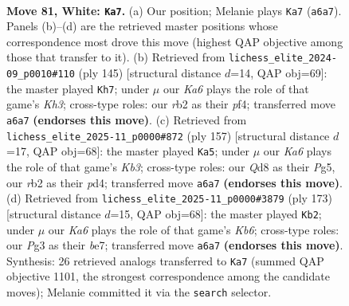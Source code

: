 \documentclass[11pt]{article}
\begin{document}
\clearpage

\begin{figure}[p]\centering
\begin{subfigure}{0.46\textwidth}\centering
\resizebox{\linewidth}{!}{%
\newchessgame
\chessboard[
  setfen={3Q4/8/K1q2pk1/8/8/6P1/1r6/8 w - - 12 81},
  showmover=false,
  pgfstyle=straightmove, color=movearrow, markmove={a6-a7}
]}
\caption{}
\end{subfigure}\hfill
\begin{subfigure}{0.46\textwidth}\centering
\resizebox{\linewidth}{!}{%
\newchessgame
\chessboard[
  setfen={8/8/5Q1k/8/5P2/6PK/8/3q4 b - - 2 73},
  showmover=false,
  pgfstyle=straightmove, color=movearrow, markmove={h6-h7}
]}
\caption{}
\end{subfigure}
\\[4pt]
\begin{subfigure}{0.46\textwidth}\centering
\resizebox{\linewidth}{!}{%
\newchessgame
\chessboard[
  setfen={1Q6/5K2/1k6/3p2p1/3P4/6P1/8/8 b - - 2 79},
  showmover=false,
  pgfstyle=straightmove, color=movearrow, markmove={b6-a5}
]}
\caption{}
\end{subfigure}\hfill
\begin{subfigure}{0.46\textwidth}\centering
\resizebox{\linewidth}{!}{%
\newchessgame
\chessboard[
  setfen={8/4B3/8/8/7P/1k1Q4/5K2/R7 b - - 4 87},
  showmover=false,
  pgfstyle=straightmove, color=movearrow, markmove={b3-b2}
]}
\caption{}
\end{subfigure}
\caption{\textbf{Move 81, White: \texttt{Ka7}.} (a) Our position; Melanie plays \texttt{Ka7} (\texttt{a6a7}). Panels (b)--(d) are the retrieved master positions whose correspondence most drove this move (highest QAP objective among those that transfer to it). (b) Retrieved from \texttt{lichess\_elite\_2024-09\_p0010\#110} (ply 145) [structural distance $d$=14, QAP obj=69]: the master played \texttt{Kh7}; under $\mu$ our \emph{Ka6} plays the role of that game's \emph{Kh3}; cross-type roles: our \emph{r}b2 as their \emph{p}f4; transferred move \texttt{a6a7} \textbf{(endorses this move)}. (c) Retrieved from \texttt{lichess\_elite\_2025-11\_p0000\#872} (ply 157) [structural distance $d$=17, QAP obj=68]: the master played \texttt{Ka5}; under $\mu$ our \emph{Ka6} plays the role of that game's \emph{Kb3}; cross-type roles: our \emph{Q}d8 as their \emph{P}g5, our \emph{r}b2 as their \emph{p}d4; transferred move \texttt{a6a7} \textbf{(endorses this move)}. (d) Retrieved from \texttt{lichess\_elite\_2025-11\_p0000\#3879} (ply 173) [structural distance $d$=15, QAP obj=68]: the master played \texttt{Kb2}; under $\mu$ our \emph{Ka6} plays the role of that game's \emph{Kb6}; cross-type roles: our \emph{P}g3 as their \emph{b}e7; transferred move \texttt{a6a7} \textbf{(endorses this move)}. Synthesis: 26 retrieved analogs transferred to \texttt{Ka7} (summed QAP objective 1101, the strongest correspondence among the candidate moves); Melanie committed it via the \texttt{search} selector.}
\label{fig:thought-m160}
\end{figure}
\end{document}
